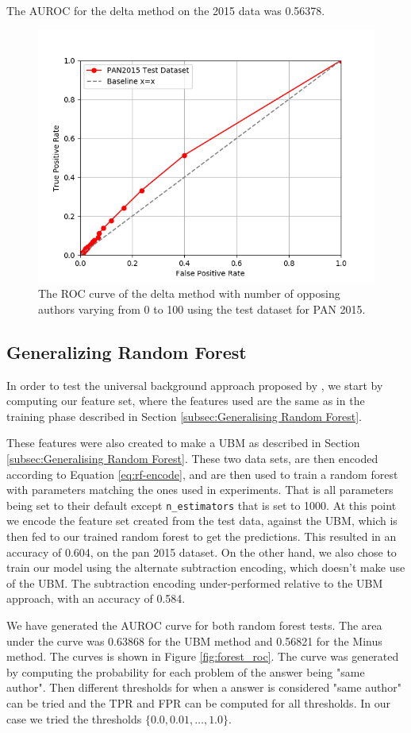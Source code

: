 The \gls{AUROC} for the delta method on the 2015 data was 0.56378.

\begin{figure}
    \centering
    \includegraphics[width=.7\textwidth]{./pictures/delta_method_roc.png}
    \caption{The ROC curve of the delta method with number of opposing authors
    varying from 0 to 100 using the test dataset for PAN 2015.}
    \label{fig:delta_method_roc}
\end{figure}

\subsection{Generalizing Random Forest}
In order to test the universal background approach proposed by
\cite{pacheco2015}, we start by computing our feature set, where the features
used are the same as in the training phase described in Section
\ref{subsec:Generalising Random Forest}.

These features were also created to make a \gls{UBM} as described in Section
\ref{subsec:Generalising Random Forest}. These two data sets, are then encoded
according to Equation \eqref{eq:rf-encode}, and are then used to train a random
forest with parameters matching the ones used in experiments. That is all
parameters being set to their default except \texttt{n\_estimators} that is set
to 1000. At this point we encode the feature set created from the test data,
against the \gls{UBM}, which is then fed to our trained random forest to get the
predictions. This resulted in an accuracy of 0.604, on the pan 2015 dataset. On
the other hand, we also chose to train our model using the alternate subtraction
encoding, which doesn't make use of the \gls{UBM}. The subtraction encoding
under-performed relative to the \gls{UBM} approach, with an accuracy of 0.584.

We have generated the \gls{AUROC} curve for both random forest tests. The area
under the curve was 0.63868 for the \gls{UBM} method and 0.56821 for the Minus
method. The curves is shown in Figure \ref{fig:forest_roc}. The curve was
generated by computing the probability for each problem of the answer being
"same author". Then different thresholds for when a answer is considered "same
author" can be tried and the \gls{TPR} and \gls{FPR} can be computed for all
thresholds. In our case we tried the thresholds $\{0.0, 0.01, \dots, 1.0\}$.

